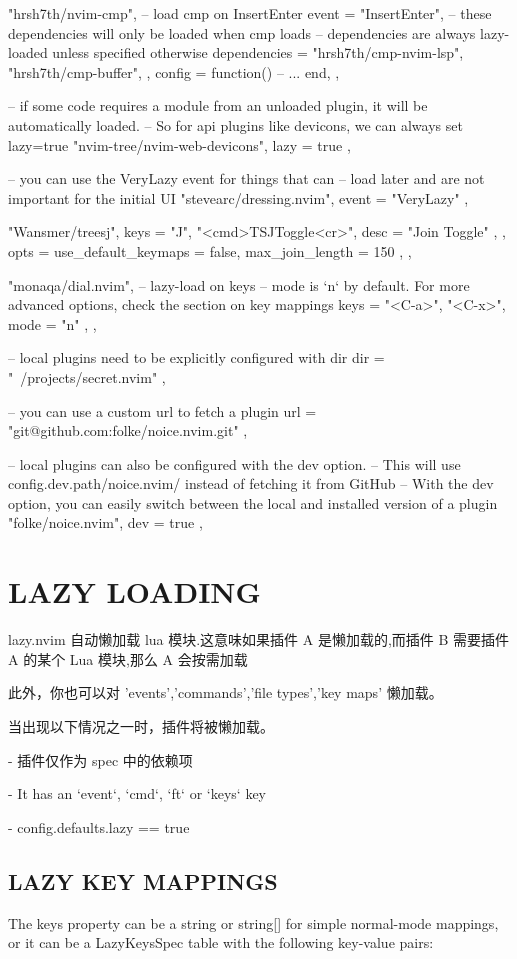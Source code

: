\begin{listing}
{{
"hrsh7th/nvim-cmp",
-- load cmp on InsertEnter
event = "InsertEnter",
-- these dependencies will only be loaded when cmp loads
-- dependencies are always lazy-loaded unless specified otherwise
dependencies = {
"hrsh7th/cmp-nvim-lsp",
"hrsh7th/cmp-buffer",
},
config = function()
-- ...
end,
},

-- if some code requires a module from an unloaded plugin, it will be automatically loaded.
-- So for api plugins like devicons, we can always set lazy=true
{ "nvim-tree/nvim-web-devicons", lazy = true },

-- you can use the VeryLazy event for things that can
-- load later and are not important for the initial UI
{ "stevearc/dressing.nvim", event = "VeryLazy" },

{
"Wansmer/treesj",
keys = {
{ "J", "<cmd>TSJToggle<cr>", desc = "Join Toggle" },
},
opts = { use_default_keymaps = false, max_join_length = 150 },
},

{
"monaqa/dial.nvim",
-- lazy-load on keys
-- mode is `n` by default. For more advanced options, check the section on key mappings
keys = { "<C-a>", { "<C-x>", mode = "n" } },
},

-- local plugins need to be explicitly configured with dir
{ dir = "~/projects/secret.nvim" },

-- you can use a custom url to fetch a plugin
{ url = "git@github.com:folke/noice.nvim.git" },

-- local plugins can also be configured with the dev option.
-- This will use {config.dev.path}/noice.nvim/ instead of fetching it from GitHub
-- With the dev option, you can easily switch between the local and installed version of a plugin
{ "folke/noice.nvim", dev = true },
}



\section{LAZY LOADING}
lazy.nvim 自动懒加载 lua 模块.这意味如果插件 A 是懒加载的,而插件 B 需要插件 A 的某个 Lua 模块,那么 A 会按需加载

此外，你也可以对 'events','commands','file types','key maps' 懒加载。

当出现以下情况之一时，插件将被懒加载。

- 插件仅作为 spec 中的依赖项

- It has an `event`, `cmd`, `ft` or `keys` key

- config.defaults.lazy == true

\subsection{LAZY KEY MAPPINGS}
The keys property can be a string or string[] for simple normal-mode mappings, or it can be a LazyKeysSpec table with the following key-value pairs:


\end{listing}

